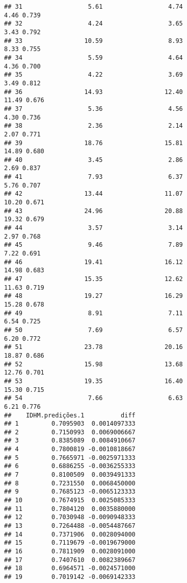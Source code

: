 \documentclass[
]{article}
\begin{document}
\begin{verbatim}
## 31                  5.61                  4.74                  4.46 0.739
## 32                  4.24                  3.65                  3.43 0.792
## 33                 10.59                  8.93                  8.33 0.755
## 34                  5.59                  4.64                  4.36 0.700
## 35                  4.22                  3.69                  3.49 0.812
## 36                 14.93                 12.40                 11.49 0.676
## 37                  5.36                  4.56                  4.30 0.736
## 38                  2.36                  2.14                  2.07 0.771
## 39                 18.76                 15.81                 14.89 0.680
## 40                  3.45                  2.86                  2.69 0.837
## 41                  7.93                  6.37                  5.76 0.707
## 42                 13.44                 11.07                 10.20 0.671
## 43                 24.96                 20.88                 19.32 0.679
## 44                  3.57                  3.14                  2.97 0.768
## 45                  9.46                  7.89                  7.22 0.691
## 46                 19.41                 16.12                 14.98 0.683
## 47                 15.35                 12.62                 11.63 0.719
## 48                 19.27                 16.29                 15.28 0.678
## 49                  8.91                  7.11                  6.54 0.725
## 50                  7.69                  6.57                  6.20 0.772
## 51                 23.78                 20.16                 18.87 0.686
## 52                 15.98                 13.68                 12.76 0.701
## 53                 19.35                 16.40                 15.30 0.715
## 54                  7.66                  6.63                  6.21 0.776
##    IDHM.predições.1          diff
## 1         0.7095903  0.0014097333
## 2         0.7150993  0.0069006667
## 3         0.8385089  0.0084910667
## 4         0.7800819 -0.0010818667
## 5         0.7665971 -0.0025971333
## 6         0.6886255 -0.0036255333
## 7         0.8100509  0.0039491333
## 8         0.7231550  0.0068450000
## 9         0.7685123 -0.0065123333
## 10        0.7674915  0.0025085333
## 11        0.7804120  0.0035880000
## 12        0.7030948 -0.0090948333
## 13        0.7264488 -0.0054487667
## 14        0.7371906  0.0028094000
## 15        0.7119679 -0.0019679000
## 16        0.7811909  0.0028091000
## 17        0.7407610  0.0082389667
## 18        0.6964571 -0.0024571000
## 19        0.7019142 -0.0069142333

\end{verbatim}
\end{document}
